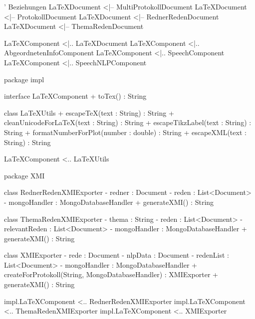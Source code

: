 {  ' Beziehungen
  LaTeXDocument <|-- MultiProtokollDocument
  LaTeXDocument <|-- ProtokollDocument
  LaTeXDocument <|-- RednerRedenDocument
  LaTeXDocument <|-- ThemaRedenDocument

  LaTeXComponent <|.. LaTeXDocument
  LaTeXComponent <|.. AbgeordnetenInfoComponent
  LaTeXComponent <|.. SpeechComponent
  LaTeXComponent <|.. SpeechNLPComponent

  package impl {
    interface LaTeXComponent {
      + toTex() : String
    }

    class LaTeXUtils {
      + escapeTeX(text : String) : String
      + cleanUnicodeForLaTeX(text : String) : String
      + escapeTikzLabel(text : String) : String
      + formatNumberForPlot(number : double) : String
      + escapeXML(text : String) : String
    }

    LaTeXComponent <.. LaTeXUtils
  }

  package XMI {
    class RednerRedenXMIExporter {
      - redner : Document
      - reden : List<Document>
      - mongoHandler : MongoDatabaseHandler
      + generateXMI() : String
    }

    class ThemaRedenXMIExporter {
      - thema : String
      - reden : List<Document>
      - relevantReden : List<Document>
      - mongoHandler : MongoDatabaseHandler
      + generateXMI() : String
    }

    class XMIExporter {
      - rede : Document
      - nlpData : Document
      - redenList : List<Document>
      - mongoHandler : MongoDatabaseHandler
      + createForProtokoll(String, MongoDatabaseHandler) : XMIExporter
      + generateXMI() : String
    }

    impl.LaTeXComponent <.. RednerRedenXMIExporter
    impl.LaTeXComponent <.. ThemaRedenXMIExporter
    impl.LaTeXComponent <.. XMIExporter
  }

}


